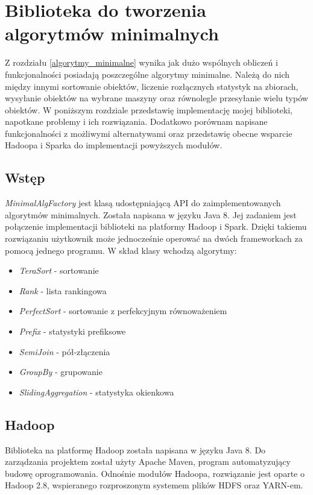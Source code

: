 \documentclass{pracamgr}
\begin{document}
\chapter{Biblioteka do tworzenia algorytmów minimalnych}

Z rozdziału \ref{algorytmy_minimalne} wynika jak dużo wspólnych obliczeń i funkcjonalności posiadają poszczególne algorytmy minimalne. Należą do nich między innymi sortowanie obiektów, liczenie rozłącznych statystyk na zbiorach, wysyłanie obiektów na wybrane maszyny oraz równolegle przesyłanie wielu typów obiektów. W poniższym rozdziale przedstawię implementację mojej biblioteki, napotkane problemy i ich rozwiązania. Dodatkowo porównam napisane funkcjonalności z możliwymi alternatywami oraz przedstawię obecne wsparcie Hadoopa i Sparka do implementacji powyższych modułów.

\section{Wstęp}
\textit{MinimalAlgFactory} jest klasą udostępniającą API do zaimplementowanych algorytmów minimalnych. Została napisana w języku Java 8. Jej zadaniem jest połączenie implementacji biblioteki na platformy Hadoop i Spark. Dzięki takiemu rozwiązaniu użytkownik może jednocześnie operować na dwóch frameworkach za pomocą jednego programu. W skład klasy wchodzą algorytmy:
\begin{itemize}
    \item \textit{TeraSort} - sortowanie
    \item \textit{Rank} - lista rankingowa
    \item \textit{PerfectSort} - sortowanie z perfekcyjnym równoważeniem
    \item \textit{Prefix} - statystyki prefiksowe
    \item \textit{SemiJoin} - pół-złączenia
    \item \textit{GroupBy} - grupowanie
    \item \textit{SlidingAggregation} - statystyka okienkowa
\end{itemize}

\section{Hadoop}

Biblioteka na platformę Hadoop została napisana w języku Java 8. Do zarządzania projektem został użyty Apache Maven, program automatyzujący budowę oprogramowania. Odnośnie modułów Hadoopa, rozwiązanie jest oparte o Hadoop 2.8, wspieranego rozproszonym systemem plików HDFS oraz YARN-em.
\end{document}
